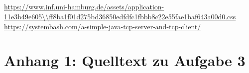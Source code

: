 \documentclass[twoside]{article}
\begin{document}
\subsection{}
\subsection{}
\subsection{}

\begin{thebibliography}{1}
	\url{https://www.inf.uni-hamburg.de/assets/application-11e3b49e605\\ff8ba1f01d275bd36850edfdfc1fbbb8c22e55fae1baf643a00d0.css}
	\url{https://systembash.com/a-simple-java-tcp-server-and-tcp-client/}
\end{thebibliography}
\newpage
\section*{Anhang 1: Quelltext zu Aufgabe 3}
\end{document}
